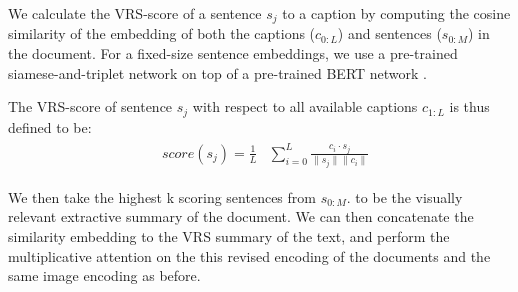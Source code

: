 \documentclass[11pt,a4paper]{article}
\newcommand\gal[1]{\textcolor{bright}{\textbf{GAL:} #1 }}
\newcommand\yuval[1]{\textcolor{darkpink}{\textbf{YUVAL:} #1 }}
\newcommand\tzuf[1]{\textcolor{blue}{\textbf{TZUF:} #1 }}
\begin{document}


We calculate the VRS-score of a sentence $s_j$ to a caption by computing the cosine similarity of the embedding of both the captions ($c_{0:L}$) and sentences ($s_{0:M}$) in the document. For a fixed-size sentence embeddings, we use a pre-trained siamese-and-triplet network \citep{reimers2019sentence, Schroff_2015_CVPR} on top of a pre-trained BERT network \cite{devlin2019bert}.


The VRS-score of sentence $s_j$ with respect to all available captions  $c_{1:L}$ is thus defined to be:
\begin{equation}
\begin{aligned}
\begin{split}
\label{eq:score}
&score(s_j)= \frac{1}{L}
&\sum_{i=0}^{L} \frac{c_i\cdot s_j}{\| s_j\|\| c_i\| }
\end{split}
\end{aligned}
\end{equation}


We then take the highest k scoring sentences from \(s_{0:M}\). 
to be the visually relevant extractive summary of the document. We can then concatenate the similarity embedding to the VRS summary of the text, and perform the multiplicative attention on the this revised encoding of the documents and the same image encoding as before.\par
\end{document}
